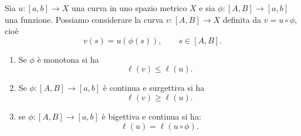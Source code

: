 \begin{theorem}[riparametrizzazione]
Sia $u \colon [a,b] \to X$ una curva in uno spazio metrico $X$ 
e sia $\phi \colon [A,B] \to [a,b]$ una funzione.
Possiamo considerare la curva $v \colon [A,B] \to X$ definita da
$v=u \circ \phi$, cioè
\[
  v(s) = u(\phi(s)), \qquad s\in [A,B].
\]

\begin{enumerate}
\item
Se $\phi$ è monotona si ha
\[
  \ell(v) \le \ell(u).
\]
\item Se $\phi\colon [A,B] \to [a,b]$ è continua e surgettiva si ha
\[
  \ell(v) \ge \ell(u).
\]
\item se $\phi\colon [A,B] \to [a,b]$ è bigettiva e continua
si ha:
\[
  \ell(u) = \ell(u\circ \phi).
\]
\end{enumerate}
\end{theorem}
%
